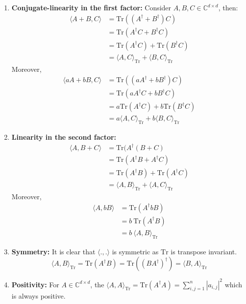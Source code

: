 \documentclass[12pt]{article}
\renewcommand{\>}{\rangle}
\newcommand{\<}{\langle}
\newcommand{\C}{\mathbb{C}}
\begin{document}
\begin{enumerate}
    \item \textbf{Conjugate-linearity in the first factor:}
    Consider $A, B, C \in\C^{d\times d}$, then:
    \begin{align*}
        \< A + B , C\> & = \mathrm{Tr}((A^\dagger + B^\dagger)  C) \\
                       & = \mathrm{Tr}(A^\dagger C + B^\dagger C) \\
                       & = \mathrm{Tr}(A^\dagger C) +  \mathrm{Tr}(B^\dagger C) \\
                       & = \<A, C\>_{\mathrm{Tr}} +  \<B, C\>_{\mathrm{Tr}}
    \end{align*}
    Moreover,
    \begin{align*}
        \< aA + bB , C\> & = \mathrm{Tr}((aA^\dagger + bB^\dagger)  C) \\
                       & = \mathrm{Tr}(aA^\dagger C + bB^\dagger C) \\
                       & = a \mathrm{Tr}(A^\dagger C) +  b \mathrm{Tr}(B^\dagger C) \\
                       & = a \<A, C\>_{\mathrm{Tr}} +  b \<B, C\>_{\mathrm{Tr}}
    \end{align*}
    \item \textbf{Linearity in the second factor:}
        \begin{align*}
        \< A , B + C\> & = \mathrm{Tr}(A^\dagger (B + C) \\
                       & = \mathrm{Tr}(A^\dagger B + A^\dagger C) \\
                       & =  \mathrm{Tr}(A^\dagger B) +   \mathrm{Tr}(A^\dagger C) \\
                       & =  \<A, B\>_{\mathrm{Tr}} +   \<A, C\>_{\mathrm{Tr}}
    \end{align*}
    Moreover,
    \begin{align*}
        \< A , bB\> & = \mathrm{Tr}(A^\dagger bB) \\
                       & = b~ \mathrm{Tr}(A^\dagger B) \\
                       & = b~ \<A, B\>_{\mathrm{Tr}}
    \end{align*}
    \item \textbf{Symmetry:} It is clear that $\< . , .\>$ is symmetric as $\mathrm{Tr}$ is transpose invariant.
    $$\< A, B \>_{\mathrm{Tr}} = \mathrm{Tr}(A^\dagger B) = \mathrm{Tr}((B A^\dagger)^\dagger) =  \< B, A \>_{\mathrm{Tr}}$$
    \item \textbf{Positivity:} For $A \in \C^{d\times d}$, the $\< A, A \>_{\mathrm{Tr}} = \mathrm{Tr}(A^\dagger A) = \sum_{i,j = 1}^{n} |a_{i,j}|^2$ which is always positive.
    
    
\end{enumerate}
\end{document}
